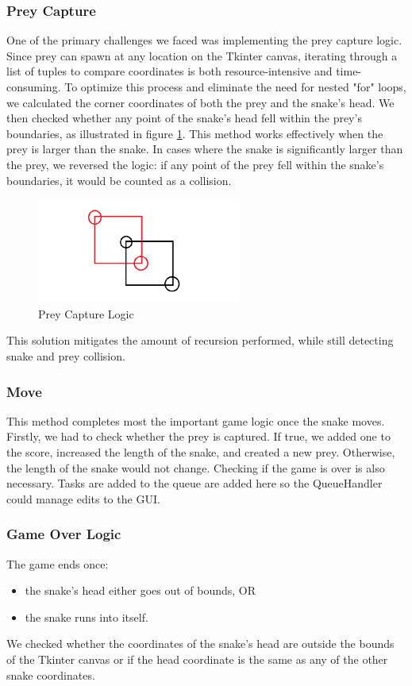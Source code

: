 \documentclass{article}
\begin{document}
\subsubsection{Prey Capture}
One of the primary challenges we faced was implementing the prey capture logic. Since prey can spawn at any location on the Tkinter canvas, iterating through a list of tuples to compare coordinates is both resource-intensive and time-consuming. To optimize this process and eliminate the need for nested "for" loops, we calculated the corner coordinates of both the prey and the snake's head. We then checked whether any point of the snake's head fell within the prey's boundaries, as illustrated in figure \ref{fig:prey_capture}. This method works effectively when the prey is larger than the snake. In cases where the snake is significantly larger than the prey, we reversed the logic: if any point of the prey fell within the snake's boundaries, it would be counted as a collision.
\begin{figure}[H]
   \centering
    \includegraphics[width=0.6\textwidth]{prey_capture.png}
    \caption{Prey Capture Logic}
    \label{fig:prey_capture}

\end{figure}

This solution mitigates the amount of recursion performed, while still detecting snake and prey collision.
\subsubsection{Move}
This method completes most the important game logic once the snake moves. Firstly, we had to check whether the prey is captured. If true, we added one to the score, increased the length of the snake, and created a new prey. Otherwise, the length of the snake would not change. Checking if the game is over is also necessary. Tasks are added to the queue are added here so the QueueHandler could manage edits to the GUI.
\subsubsection{Game Over Logic}
The game ends once:
\begin{itemize}
    \item the snake's head either goes out of bounds, OR
    \item the snake runs into itself.
\end{itemize}
We checked whether the coordinates of the snake's head are outside the bounds of the Tkinter canvas or if the head coordinate is the same as any of the other snake coordinates.
\end{document}
